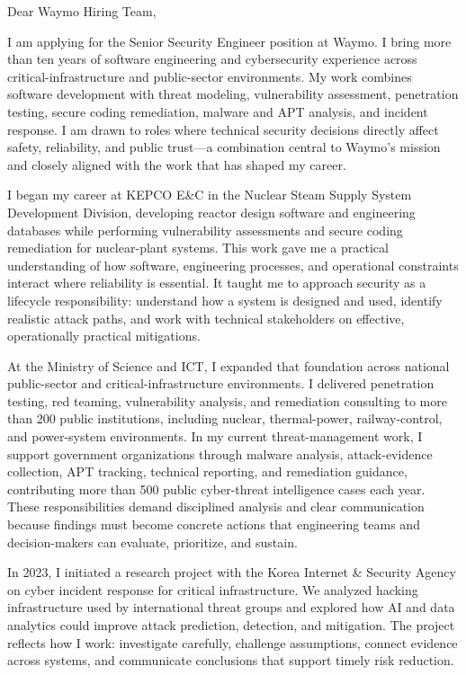 \documentclass[12pt]{article}
\begin{document}
\onehalfspacing

Dear Waymo Hiring Team,

I am applying for the Senior Security Engineer position at Waymo. I bring more than ten years of software engineering and cybersecurity experience across critical-infrastructure and public-sector environments. My work combines software development with threat modeling, vulnerability assessment, penetration testing, secure coding remediation, malware and APT analysis, and incident response. I am drawn to roles where technical security decisions directly affect safety, reliability, and public trust---a combination central to Waymo's mission and closely aligned with the work that has shaped my career.

I began my career at KEPCO E\&C in the Nuclear Steam Supply System Development Division, developing reactor design software and engineering databases while performing vulnerability assessments and secure coding remediation for nuclear-plant systems. This work gave me a practical understanding of how software, engineering processes, and operational constraints interact where reliability is essential. It taught me to approach security as a lifecycle responsibility: understand how a system is designed and used, identify realistic attack paths, and work with technical stakeholders on effective, operationally practical mitigations.

At the Ministry of Science and ICT, I expanded that foundation across national public-sector and critical-infrastructure environments. I delivered penetration testing, red teaming, vulnerability analysis, and remediation consulting to more than 200 public institutions, including nuclear, thermal-power, railway-control, and power-system environments. In my current threat-management work, I support government organizations through malware analysis, attack-evidence collection, APT tracking, technical reporting, and remediation guidance, contributing more than 500 public cyber-threat intelligence cases each year. These responsibilities demand disciplined analysis and clear communication because findings must become concrete actions that engineering teams and decision-makers can evaluate, prioritize, and sustain.

In 2023, I initiated a research project with the Korea Internet \& Security Agency on cyber incident response for critical infrastructure. We analyzed hacking infrastructure used by international threat groups and explored how AI and data analytics could improve attack prediction, detection, and mitigation. The project reflects how I work: investigate carefully, challenge assumptions, connect evidence across systems, and communicate conclusions that support timely risk reduction.
\end{document}

